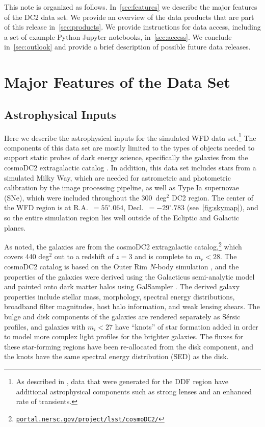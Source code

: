 \documentclass[modern]{descnote}
\newcommand*{\https}[1]{\href{https://#1}{\nolinkurl{#1}}}
\begin{document}
This note is organized as follows. In~\autoref{sec:features} we describe the major features of the DC2 data set. We provide an overview of the data products that are part of this release in~\autoref{sec:products}. We provide instructions for data access, including a set of example Python Jupyter notebooks, in~\autoref{sec:access}. We conclude in~\autoref{sec:outlook} and provide a brief description of possible future data releases. 

\section{Major Features of the Data Set}
\label{sec:features}

\subsection{Astrophysical Inputs}

Here we describe the astrophysical inputs for the simulated WFD data set.\footnote{As described in \cite{2020arXiv201005926L}, data that were generated for the DDF region have additional astrophysical components such as strong lenses and an enhanced rate of transients.}  The components of this data set are mostly limited to the types of objects needed to support static probes of dark energy science, specifically the galaxies from the cosmoDC2 extragalactic catalog \citep{korytov}.  In addition, this data set includes stars from a simulated Milky Way, which are needed for astrometric and photometric calibration by the image processing pipeline, as well as Type Ia supernovae (SNe), which were included throughout the 300~deg$^2$ DC2 region.  The center of the WFD region is at R.A.~$= 55^\circ\!\!.064$, Decl.~$= -29^\circ\!\!.783$ (see~\autoref{fig:skymap}), and so the entire simulation region lies well outside of the Ecliptic and Galactic planes.

As noted, the galaxies are from the cosmoDC2 extragalactic catalog,\footnote{ \https{portal.nersc.gov/project/lsst/cosmoDC2/}} which covers 440 deg$^2$ out to a redshift of $z = 3$ and is complete to $m_r <28$.  The cosmoDC2 catalog is based on the Outer Rim $N$-body simulation \citep{2019ApJS..245...16H}, and the properties of the galaxies were derived using the Galacticus semi-analytic model \citep{benson_2010b} and painted onto dark matter halos using GalSampler \citep{2020MNRAS.495.5040H}.  The derived galaxy properties include stellar mass, morphology, spectral energy distributions, broadband filter magnitudes, host halo information, and weak lensing shears.   The bulge and disk components of the galaxies are rendered separately as S\'ersic profiles, and galaxies with $m_i < 27$ have ``knots'' of star formation added in order to model more complex light profiles for the brighter galaxies. The fluxes for these star-forming regions have been re-allocated from the disk component, and the knots have the same spectral energy distribution (SED) as the disk.
\end{document}
